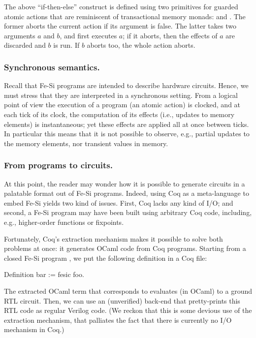 \documentclass{llncs}
\begin{document}
The above ``if-then-else'' construct is defined using two primitives
for guarded atomic actions that are reminiscent of transactional
memory monads:  and . The former aborts the
current action if its argument is false.
%
The latter takes two arguments $a$ and $b$, and first executes $a$; if
it aborts, then the effects of $a$ are discarded and $b$ is run. If
$b$ aborts too, the whole action  aborts.

\subsubsection{Synchronous semantics.} Recall that Fe-Si programs are
intended to describe hardware circuits. Hence, we must stress that
they are interpreted in a synchronous setting.
%
From a logical point of view the execution of a program (an atomic
action) is clocked, and at each tick of its clock, the computation of
its effects (i.e., updates to memory elements) is instantaneous; 
yet these effects are applied all at once between ticks. 
%
In particular this means that it is not possible to observe, e.g.,
partial updates to the memory elements, nor transient values in
memory.

\subsubsection{From programs to circuits.} At this point, the reader may
wonder how it is possible to generate circuits in a palatable format
out of Fe-Si programs. Indeed, using Coq as a meta-language to embed
Fe-Si yields two kind of issues. First, Coq lacks any kind of I/O; and
second, a Fe-Si program may have been built using arbitrary Coq code,
including, e.g., higher-order functions or fixpoints.

Fortunately, Coq's extraction mechanism makes it possible to solve
both problems at once: it generates OCaml code from Coq
programs. Starting from a closed Fe-Si program , we put the
following definition in a Coq file: 
\begin{mcoq}
Definition bar := fesic foo.  
\end{mcoq}
The extracted OCaml term that corresponds to  evaluates (in OCaml) to a
ground RTL circuit. Then, we can use an (unverified) back-end that
pretty-prints this RTL code as regular Verilog code. 
%
(We reckon that this is some devious use of the extraction mechanism,
that palliates the fact that there is currently no I/O mechanism in
Coq.)
\end{document}
